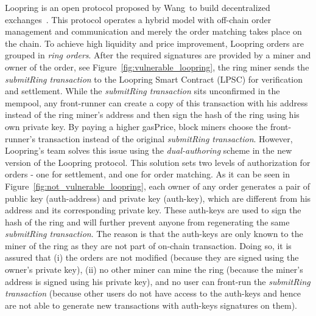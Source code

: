 Loopring is an open protocol proposed by Wang~\etal to build decentralized exchanges~\cite{wang2018loopring}. This protocol operates a hybrid model with off-chain order management and communication and merely the order matching takes place on the chain. To achieve high liquidity and price improvement, Loopring orders are grouped in \emph{ring orders}. After the required signatures are provided by a miner and owner of the order, see Figure~\ref{fig:vulnerable_loopring}, the ring miner sends the \emph{submitRing transaction} to the Loopring Smart Contract (LPSC) for verification and settlement. While the \emph{submitRing transaction} sits unconfirmed in the mempool, any front-runner can create a copy of this transaction with his address instead of the ring miner's address and then sign the hash of the ring using his own private key. By paying a higher gasPrice, block miners choose the front-runner's transaction instead of the original \emph{submitRing transaction}. However, Loopring's team solves this issue using the \emph{dual-authoring} scheme in the new version of the Loopring protocol. This solution sets two levels of authorization for orders - one for settlement, and one for order matching. As it can be seen in Figure~\ref{fig:not_vulnerable_loopring}, each owner of any order generates a pair of public key (auth-address) and private key (auth-key), which are different from his address and its corresponding private key. These auth-keys are used to sign the hash of the ring and will further prevent anyone from regenerating the same \emph{submitRing transaction}. The reason is that the auth-keys are only known to the miner of the ring as they are not part of on-chain transaction. Doing so, it is assured that (i) the orders are not modified (because they are signed using the owner's private key), (ii) no other miner can mine the ring (because the miner's address is signed using his private key), and no user can front-run the \emph{submitRing transaction} (because other users do not have access to the auth-keys and hence are not able to generate new transactions with auth-keys signatures on them).

